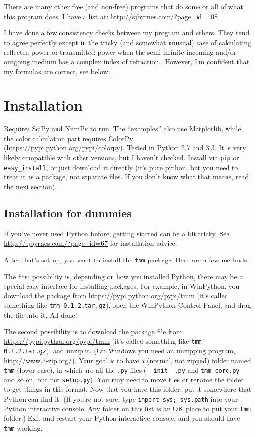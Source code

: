 \documentclass[12pt]{article}
\renewcommand{\(}{\left(}
\renewcommand{\)}{\right)}
\begin{document}
There are many other free (and non-free) programs that do some or all of what this program does. I have a list at: \url{http://sjbyrnes.com/?page_id=108}

I have done a few consistency checks between my program and others. They tend to agree perfectly except in the tricky (and somewhat unusual) case of calculating reflected power or transmitted power when the semi-infinite incoming and/or outgoing medium has a complex index of refraction. [However, I'm confident that my formulas are correct, see below.]

\section{Installation}

Requires SciPy and NumPy to run. The ``examples'' also use Matplotlib, while the color calculation part requires ColorPy (\url{https://pypi.python.org/pypi/colorpy}). Tested in Python 2.7 and 3.3. It is very likely compatible with other versions, but I haven't checked. Install via \verb=pip= or \verb=easy_install=, or just download it directly (it's pure python, but you need to treat it as a package, not separate files. If you don't know what that means, read the next section).

\subsection{Installation for dummies}

If you've never used Python before, getting started can be a bit tricky. See \url{http://sjbyrnes.com/?page_id=67} for installation advice.

After that's set up, you want to install the \verb=tmm= package. Here are a few methods.

The first possibility is, depending on how you installed Python, there may be a special easy interface for installing packages. For example, in WinPython, you download the package from \url{https://pypi.python.org/pypi/tmm} (it's called something like \verb=tmm-0.1.2.tar.gz=), open the WinPython Control Panel, and drag the file into it. All done!

The second possibility is to download the package file from \url{https://pypi.python.org/pypi/tmm} (it's called something like \verb=tmm-0.1.2.tar.gz=), and unzip it. (On Windows you need an unzipping program, \url{http://www.7-zip.org/}). Your goal is to have a (normal, not zipped) folder named \verb=tmm= (lower-case), in which are all the \verb=.py= files (\verb=__init__.py= and \verb=tmm_core.py= and so on, but not \verb=setup.py=). You may need to move files or rename the folder to get things in this format. Now that you have this folder, put it somewhere that Python can find it. (If you're not sure, type \verb=import sys; sys.path= into your Python interactive console. Any folder on this list is an OK place to put your \verb=tmm= folder.) Exit and restart your Python interactive console, and you should have \verb=tmm= working.
\end{document}
